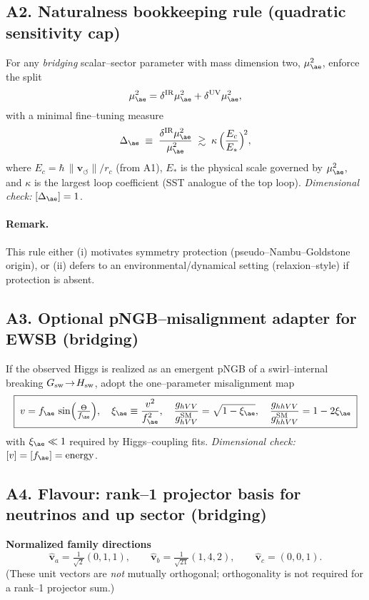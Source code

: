 \documentclass[11pt]{article}
\begin{document}
      \subsection*{A2. Naturalness bookkeeping rule (quadratic sensitivity cap)}
          For any \emph{bridging} scalar–sector parameter with mass dimension two, $\mu_{\ae}^2$, enforce the split
          \[
              \mu_{\ae}^2=\delta^{\mathrm{IR}}\mu_{\ae}^2+\delta^{\mathrm{UV}}\mu_{\ae}^2,
          \]
          with a minimal fine–tuning measure
          \[
              \Delta_{\ae}\;\equiv\;\frac{\delta^{\mathrm{IR}}\mu_{\ae}^2}{\mu_{\ae}^2}
              \;\gtrsim\; \kappa\,\Big(\frac{E_c}{E_*}\Big)^{\!2},
          \]
          where $E_c=\hbar\,\|\mathbf v_{\!\circlearrowleft}\|/r_c$ (from A1), $E_*$ is the physical scale governed by $\mu_{\ae}^2$, and $\kappa$ is the largest loop coefficient (SST analogue of the top loop). \textit{Dimensional check:} $[\Delta_{\ae}]=1$.

          \paragraph{Remark.} This rule either (i) motivates symmetry protection (pseudo–Nambu–Goldstone origin), or (ii) defers to an environmental/dynamical setting (relaxion–style) if protection is absent.

  \subsection*{A3. Optional pNGB–misalignment adapter for EWSB (bridging)}
      If the observed Higgs is realized as an emergent pNGB of a swirl–internal breaking $G_{\rm sw}\!\to\! H_{\rm sw}$, adopt the one–parameter misalignment map
      \[
          \boxed{\;
          v=f_{\ae}\,\sin\!\Big(\tfrac{\Theta}{f_{\ae}}\Big),\quad \xi_{\ae}\equiv\frac{v^2}{f_{\ae}^2},\quad
          \frac{g_{hVV}}{g_{hVV}^{\rm SM}}=\sqrt{1-\xi_{\ae}},\quad
          \frac{g_{hhVV}}{g_{hhVV}^{\rm SM}}=1-2\xi_{\ae} \;}
      \]
      with $\xi_{\ae}\ll1$ required by Higgs–coupling fits. \textit{Dimensional check:} $[v]=[f_{\ae}]=\mathrm{energy}$.

  \subsection*{A4. Flavour: rank–1 projector basis for neutrinos and up sector (bridging)}

      \textbf{Normalized family directions}
      \[
          \hat{\mathbf v}_a=\tfrac{1}{\sqrt{2}}(0,1,1),\qquad
          \hat{\mathbf v}_b=\tfrac{1}{\sqrt{21}}(1,4,2),\qquad
          \hat{\mathbf v}_c=(0,0,1).
      \]
      (These unit vectors are \emph{not} mutually orthogonal; orthogonality is not required for a rank–1 projector sum.)
\end{document}
